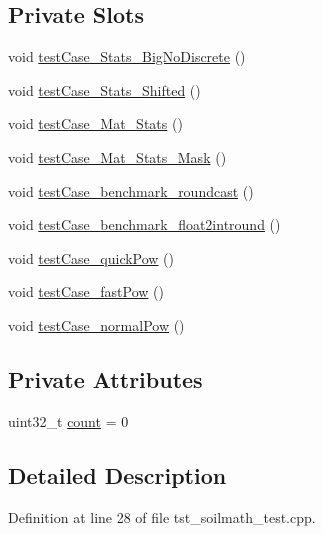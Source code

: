 \subsection*{Private Slots}
\begin{DoxyCompactItemize}
\item 
void \hyperlink{class_soil_math___test_a605821d942854308a2557763708c77f0}{test\+Case\+\_\+\+Stats\+\_\+\+Big\+No\+Discrete} ()
\item 
void \hyperlink{class_soil_math___test_a8e6337f7d3bbe1b344f8ae4e3b70ddab}{test\+Case\+\_\+\+Stats\+\_\+\+Shifted} ()
\item 
void \hyperlink{class_soil_math___test_a7d9aeafa693fad06c4d4a8c0409f5f58}{test\+Case\+\_\+\+Mat\+\_\+\+Stats} ()
\item 
void \hyperlink{class_soil_math___test_a8fc45bafb08a1480751e491645dc634a}{test\+Case\+\_\+\+Mat\+\_\+\+Stats\+\_\+\+Mask} ()
\item 
void \hyperlink{class_soil_math___test_ae31bfe07ba0acf742447f52f32f37519}{test\+Case\+\_\+benchmark\+\_\+roundcast} ()
\item 
void \hyperlink{class_soil_math___test_a409d3ab35999ef8a7b217f9e50ca0ba0}{test\+Case\+\_\+benchmark\+\_\+float2intround} ()
\item 
void \hyperlink{class_soil_math___test_aa6c80a8278e16cfdab3947c98c71e3be}{test\+Case\+\_\+quick\+Pow} ()
\item 
void \hyperlink{class_soil_math___test_ac8a7be30b5df394cdf1a784abcad4a04}{test\+Case\+\_\+fast\+Pow} ()
\item 
void \hyperlink{class_soil_math___test_aca4ac3b1b8790bd74559e880522559c4}{test\+Case\+\_\+normal\+Pow} ()
\end{DoxyCompactItemize}
\subsection*{Private Attributes}
\begin{DoxyCompactItemize}
\item 
uint32\+\_\+t \hyperlink{class_soil_math___test_a693af150765ec63434f414f36e27b91e}{count} = 0
\end{DoxyCompactItemize}


\subsection{Detailed Description}


Definition at line 28 of file tst\+\_\+soilmath\+\_\+test.\+cpp.



